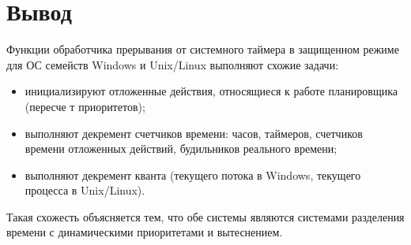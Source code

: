 \chapter*{Вывод}
Функции обработчика прерывания от системного таймера в защищенном режиме для ОС семейств Windows и Unix/Linux выполняют схожие задачи:
\begin{itemize}
	\item инициализируют отложенные действия, относящиеся к работе планировщика (пересче т приоритетов);
	\item выполняют декремент счетчиков времени: часов, таймеров, счетчиков времени отложенных действий, будильников реального времени;
	\item выполняют декремент кванта (текущего потока в Windows, текущего процесса в Unix/Linux).
\end{itemize}

Такая схожесть объясняется тем, что обе системы являются системами разделения времени с динамическими приоритетами и вытеснением.